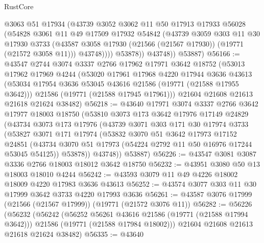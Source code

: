 \begin{lexlean}{RustCore}
\begin{coremodule}
                @3063
                @51
                @17934
                (@43739
                  @3052
                  @3062
                  @11
                  @50
                  @17913
                  @17933
                  @56028
                  (@54828
                    @3061
                    @11
                    @49
                    @17509
                    @17932
                    @54842
                    (@43739
                      @3059
                      @303
                      @11
                      @30
                      @17930
                      @3733
                      (@43587 @3058 @17930 (@21566 (@21567 @17930)) (@19771 (@21572 @3058 @11)))
                      @43748))))
              @53878))
          @43748))
      @53887)
@56166 := @43547
    @2744
    @3074
    @3337
    @2766
    @17962
    @17971
    @3642
    @18752
    (@53013
      @17962
      @17969
      @4244
      (@53020
        @17961
        @17968
        @4220
        @17944
        @3636
        @43613
        (@53034 @17954 @3636 @53045 @43616 @21586 (@19771 (@21588 @17955 @3642)))
        @21586
        (@19771 (@21588 @17945 @17961)))
      @21604
      @21608
      @21613
      @21618
      @21624
      @38482)
@56218 := @43640
    @17971
    @3074
    @3337
    @2766
    @3642
    @17977
    @18003
    @18750
    (@53810
      @3073
      @173
      @3642
      @17976
      @17149
      @24829
      (@43734
        @3073
        @173
        @17976
        (@43739
          @3071
          @303
          @171
          @30
          @17974
          @3733
          (@53827
            @3071
            @171
            @17974
            (@53832
              @3070
              @51
              @3642
              @17973
              @17152
              @24851
              (@43734 @3070 @51 @17973 (@54224 @2792 @11 @50 @16976 @17244 @53045 @54125))
              @53878))
          @43748))
      @53887)
@56226 := @43547 @3081 @3087 @3336 @2766 @18003 @18012 @3642 @18750
@56232 := @43951 @3080 @50 @13 @18003 @18010 @4244
@56242 := @43593 @3079 @11 @49 @4226 @18002 @18009 @4220 @17983 @3636 @43613
@56252 := @43574 @3077 @303 @11 @30 @17999 @3642 @3733 @4220 @17993 @3636
@56261 := @43587 @3076 @17999 (@21566 (@21567 @17999)) (@19771 (@21572 @3076 @11))
@56282 := @56226
    (@56232
      (@56242
        (@56252 @56261 @43616 @21586 (@19771 (@21588 @17994 @3642)))
        @21586
        (@19771 (@21588 @17984 @18002)))
      @21604
      @21608
      @21613
      @21618
      @21624
      @38482)
@56335 := @43640

\end{coremodule}
\end{lexlean}
